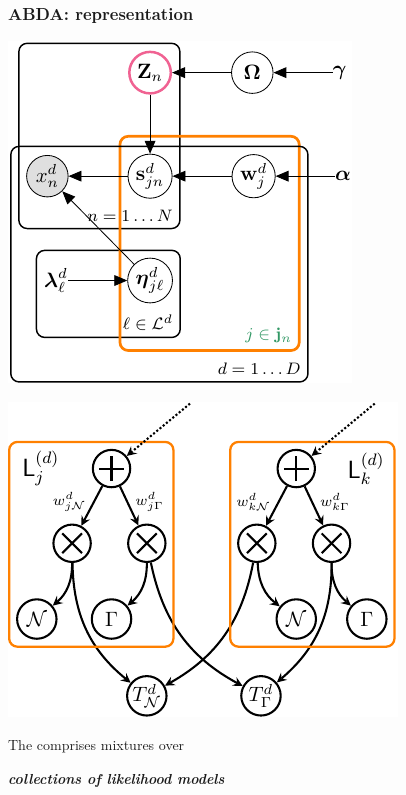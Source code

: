 \documentclass[xcolor={usenames,dvipsnames,svgnames}, compress, aspectratio=169, 11pt]{beamer}
\begin{document}
\begin{frame}[t, htt=bgrey2]
  \frametitle{ABDA: representation}

  \large
  \begin{minipage}[t]{0.3\linewidth}
    \vspace{15pt}
    \includegraphics[width=.99\linewidth]{figures/joint-param-hspn-crop}
  \end{minipage}\hfill\begin{minipage}[t]{0.3\linewidth}
    \vspace{15pt}
    \includegraphics[width=.99\linewidth]{figures/type-leaf-crop}
  \end{minipage}\hfill\begin{minipage}[t]{0.3\linewidth}
    \vspace{40pt}
    \raggedright
    The 
  comprises mixtures over\par \textbf{\emph{collections of likelihood models}}
  \end{minipage}  
\end{frame}
\end{document}
